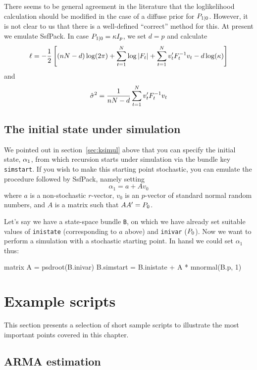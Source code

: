 There seems to be general agreement in the literature that the
loglikelihood calculation should be modified in the case of a diffuse
prior for $P_{1|0}$.  However, it is not clear to us that
there is a well-defined ``correct'' method for this.  At present we
emulate \textsf{SsfPack}.  In case
$P_{1|0} = \kappa I_p$, we set $d = p$ and calculate
%
\[
  \ell = -\frac{1}{2} \left[(nN-d) \log(2 \pi) +
    \sum_{t=1}^N\log \left|F_t\right| +
    \sum_{t=1}^Nv_t'F_t^{-1} v_t
    - d \log(\kappa)
  \right]
\]
%
and
%
\[
\hat{\sigma}^2 = \frac{1}{nN-d}
   \sum_{t=1}^Nv_t'F_t^{-1} v_t
\]

\subsection{The initial state under simulation}
\label{sec:simstart}

We pointed out in section~\ref{sec:ksimul} above that you can specify
the initial state, $\alpha_1$, from which recursion starts under
simulation via the bundle key \texttt{simstart}. If you wish to make
this starting point stochastic, you can emulate the procedure followed
by \textsf{SsfPack}, namely setting
\[
\alpha_1 = a + A v_0
\]
where $a$ is a non-stochastic $r$-vector, $v_0$ is an $p$-vector
of standard normal random numbers, and $A$ is a matrix such
that $AA' = P_0$.

Let's say we have a state-space bundle \texttt{B}, on which we have
already set suitable values of \texttt{inistate} (corresponding to $a$
above) and \texttt{inivar} ($P_0$).  Now we want to
perform a simulation with a stochastic starting point. In hansl we
could set $\alpha_1$ thus:
%
\begin{code}
matrix A = psdroot(B.inivar)
B.simstart = B.inistate + A * mnormal(B.p, 1)
\end{code}

\section{Example scripts}
\label{sec:ss-examples}

This section presents a selection of short sample scripts to
illustrate the most important points covered in this chapter.

\subsection{ARMA estimation}
\label{sec:example_arma}

